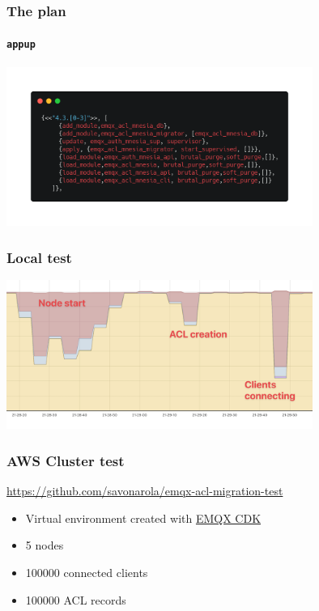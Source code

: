 \documentclass{beamer}
\begin{document}
\begin{frame}
    \frametitle{The plan}
    \framesubtitle{\lstinline{appup}}

    \begin{center}
        \includegraphics[width=10cm, keepaspectratio]{images/appup.png}
    \end{center}\end{frame}

\begin{frame}
    \frametitle{Local test}

    \begin{center}
        \includegraphics[width=10cm, keepaspectratio]{images/optimized.png}
    \end{center}
\end{frame}

\begin{frame}
    \frametitle{AWS Cluster test}

    \href{https://github.com/savonarola/emqx-acl-migration-test}{https://github.com/savonarola/emqx-acl-migration-test}
    \begin{itemize}
        \item Virtual environment created with \href{https://github.com/qzhuyan/cdk-emqx-cluster}{EMQX CDK}
        \item 5 nodes
        \item 100000 connected clients
        \item 100000 ACL records
    \end{itemize}
\end{frame}
\end{document}
